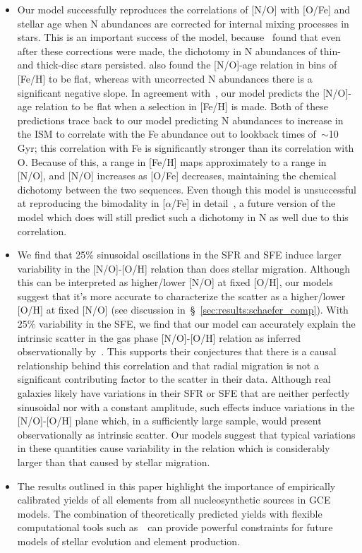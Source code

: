 \documentclass[ms.tex]{subfiles}
\begin{document}
\begin{itemize}
	\item Our model successfully reproduces the correlations of [N/O] 
	with [O/Fe] and stellar age when N abundances are corrected for internal 
	mixing processes in stars. 
	This is an important success of the model, because~\citet{Vincenzo2021} 
	found that even after these corrections were made, the dichotomy in N 
	abundances of thin- and thick-disc stars persisted. 
	\citet{Vincenzo2021} also found the [N/O]-age relation in bins of [Fe/H] to 
	be flat, whereas with uncorrected N abundances there is a significant 
	negative slope. 
	In agreement with~\citet{Vincenzo2021}, our model predicts the [N/O]-age 
	relation to be flat when a selection in [Fe/H] is made. 
	Both of these predictions trace back to our model predicting N abundances 
	to increase in the ISM to correlate with the Fe abundance out to lookback 
	times of~$\sim$10 Gyr; this correlation with Fe is significantly stronger 
	than its correlation with O. 
	Because of this, a range in [Fe/H] maps approximately to a range in [N/O], 
	and [N/O] increases as [O/Fe] decreases, maintaining the chemical 
	dichotomy between the two sequences. 
	Even though this model is unsuccessful at reproducing the bimodality in 
	[$\alpha$/Fe] in detail~\citep{Johnson2021}, a future version of the model 
	which does will still predict such a dichotomy in N as well due to this 
	correlation. 

	\item We find that 25\% sinusoidal oscillations in the SFR and SFE induce 
	larger variability in the [N/O]-[O/H] relation than does stellar migration. 
	Although this can be interpreted as higher/lower [N/O] at fixed [O/H], our 
	models suggest that it's more accurate to characterize the scatter as a 
	higher/lower [O/H] at fixed [N/O] (see discussion 
	in~\S~\ref{sec:results:schaefer_comp}). 
	With 25\% variability in the SFE, we find that our model can accurately 
	explain the intrinsic scatter in the gas phase [N/O]-[O/H] relation as 
	inferred observationally by~\citet{Schaefer2020}. 
	This supports their conjectures that there is a causal relationship behind 
	this correlation and that radial migration is not a significant 
	contributing factor to the scatter in their data. 
	Although real galaxies likely have variations in their SFR or SFE that are 
	neither perfectly sinusoidal nor with a constant amplitude, such effects 
	induce variations in the [N/O]-[O/H] plane which, in a sufficiently large 
	sample, would present observationally as intrinsic scatter.  
	Our models suggest that typical variations in these 
	quantities cause variability in the relation which is considerably larger 
	than that caused by stellar migration. 

	\item The results outlined in this paper highlight the importance of 
	empirically calibrated yields of all elements from all nucleosynthetic 
	sources in GCE models. 
	The combination of theoretically predicted yields with flexible 
	computational tools such as~\vice~can provide powerful constraints for 
	future models of stellar evolution and element production. 
\end{itemize} 
\end{document}
